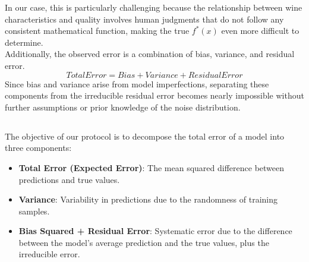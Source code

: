 \documentclass[a4paper,10pt]{article}
\begin{document}
    In our case, this is particularly challenging because the relationship between wine characteristics and quality involves human judgments that do not follow any consistent mathematical function, making the true $f^*(x)$ even more difficult to determine. \\
    
    Additionally, the observed error is a combination of bias, variance, and residual error. \[ Total Error = Bias + Variance + ResidualError\] Since bias and variance arise from model imperfections, separating these components from the irreducible residual error becomes nearly impossible without further assumptions or prior knowledge of the noise distribution.
    


\subsection{}

The objective of our protocol is to decompose the total error of a model into three components:
\begin{itemize}
    \item \textbf{Total Error (Expected Error)}: The mean squared difference between predictions and true values.
    \item \textbf{Variance}: Variability in predictions due to the randomness of training samples.
    \item \textbf{Bias Squared + Residual Error}: Systematic error due to the difference between the model's average prediction and the true values, plus the irreducible error.
\end{itemize}
\end{document}
